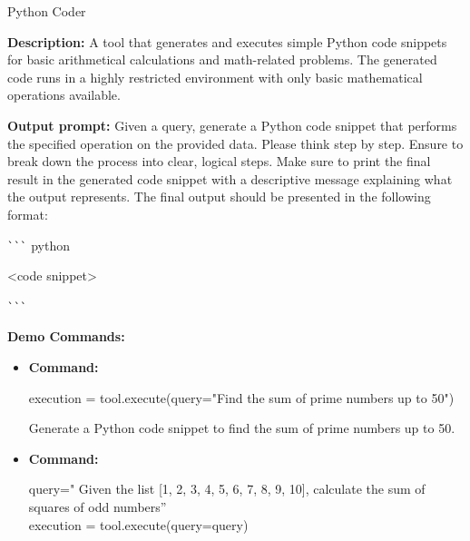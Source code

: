 


\begin{tooldescbox}{{Python Coder}}
\setlength{\parindent}{0pt}
\setlength{\parskip}{4pt}

\textbf{Description:} A tool that generates and executes simple Python code snippets for basic arithmetical calculations and math-related problems. The generated code runs in a highly restricted environment with only basic mathematical operations available.

\vspace{6pt}


\vspace{4pt}


\textbf{Output prompt:} Given a query, generate a Python code snippet that performs the specified operation on the provided data. Please think step by step. Ensure to break down the process into clear, logical steps. Make sure to print the final result in the generated code snippet with a descriptive message explaining what the output represents. The final output should be presented in the following format:
\begin{simplecode}
{\verb|```| python

<code snippet>

\verb|```| }
\end{simplecode}

\vspace{6pt}

\textbf{Demo Commands:}
\begin{itemize}[left=0pt, label={}, itemsep=0pt, parsep=0pt]
\item \textbf{Command:} 

\begin{simplecode}
{execution = tool.execute(query="Find the sum of prime numbers up to 50")}
\end{simplecode}

\enspace{} Generate a Python code snippet to find the sum of prime numbers up to 50.
    
\vspace{4pt}
    
\item \textbf{Command:} 
\begin{simplecode}
{{query=" Given the list [1, 2, 3, 4, 5, 6, 7, 8, 9, 10], calculate the sum of squares of odd numbers”\\
execution = tool.execute(query=query)}}
\end{simplecode}
    

\end{itemize}
\end{tooldescbox}

